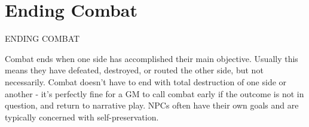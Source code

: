 

\chapter{Ending Combat}

                                           ENDING COMBAT


Combat ends when one side has accomplished their main objective. Usually this means they
have defeated, destroyed, or routed the other side, but not necessarily. Combat doesn’t have to
end with total destruction of one side or another - it’s perfectly fine for a GM to call combat early
if the outcome is not in question, and return to narrative play. NPCs often have their own goals
and are typically concerned with self-preservation.
